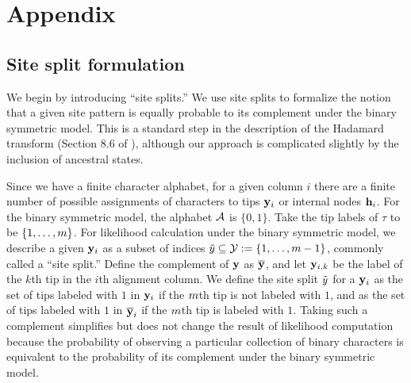 \section*{Appendix}

\subsection*{Site split formulation}
We begin by introducing ``site splits.''
We use site splits to formalize the notion that a given site pattern is equally probable to its complement under the binary symmetric model.
This is a standard step in the description of the Hadamard transform (Section 8.6 of \citet{Semple2003-em}), although our approach is complicated slightly by the inclusion of ancestral states.

Since we have a finite character alphabet, for a given column $i$ there are a finite number of possible assignments of characters to tips $\mathbf{y}_i$ or internal nodes $\mathbf{h}_i$.
For the binary symmetric model, the alphabet $\mathcal{A}$ is $\{0,1\}$.
Take the tip labels of $\tau$ to be $\{1,\ldots,m\}$.
For likelihood calculation under the binary symmetric model, we describe a given $\mathbf{y}_i$ as a subset of indices $\tilde{y}\subseteq\mathcal{Y}:=\{1,\ldots,m-1\}$, commonly called a ``site split.''
Define the complement of $\mathbf{y}$ as $\overline{\mathbf{y}}$, and let $\mathbf{y}_{i,k}$ be the label of the $k$th tip in the $i$th alignment column.
We define the site split $\tilde{y}$ for a $\mathbf{y}_i$ as the set of tips labeled with $1$ in $\mathbf{y}_i$ if the $m$th tip is not labeled with $1$, and as the set of tips labeled with $1$ in $\overline{\mathbf{y}}_i$ if the $m$th tip is labeled with $1$.
Taking such a complement simplifies but does not change the result of likelihood computation because the probability of observing a particular collection of binary characters is equivalent to the probability of its complement under the binary symmetric model.

